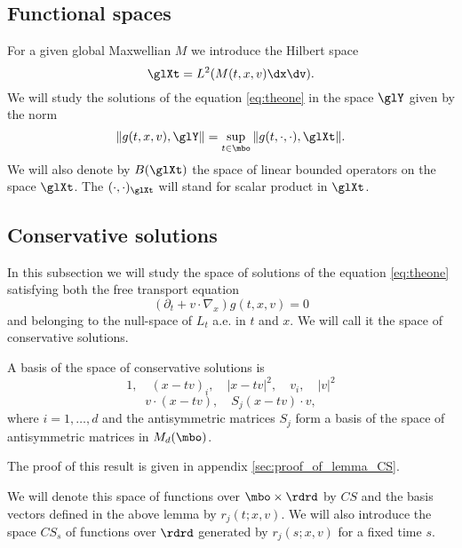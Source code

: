 \subsection{Functional spaces} %
\label{sub:functional_spaces}
For a given global Maxwellian $M$ we introduce the Hilbert space 
\begin{equation}
	\label{eq:Xt}
	\glXt=L^2(M(t,x,v)\dx\dv).
\end{equation}
We will study the solutions of the equation \eqref{eq:theone} in the space $\glY$ given by the norm
\begin{equation}
	\label{eq:Y}
	\|g(t,x,v),\glY\|=\sup_{t\in\mbo}\|g(t,\cdot,\cdot),\glXt\|.
\end{equation}
We will also denote by $B(\glXt)$ the space of linear bounded operators on the space $\glXt$. The $(\cdot,\cdot)_{\glXt}$ will stand for scalar product in $\glXt$.

\subsection{Conservative solutions} %
\label{sub:conservative_solutions}
In this subsection we will study the space of solutions of the equation \eqref{eq:theone} satisfying both the free transport equation
\[(\partial_t + v\cdot \nabla_x)g(t,x,v)=0\] and belonging to the null-space of $L_t$ a.e. in $t$ and $x$. We will call it the space of conservative solutions.	

\begin{lemma}\label{le:CS}
A basis of the space of conservative solutions is
\[1, \quad (x-tv)_i,\quad |x-tv|^2, \quad v_i,\quad |v|^2\]
\[v\cdot (x-tv),\quad S_j(x-tv)\cdot v,\]where $i=1,\dots, d$ and the antisymmetric matrices $S_j$ form a basis of the space of antisymmetric matrices in $M_d(\mbo)$.
\end{lemma}
The proof of this result is given in appendix \ref{sec:proof_of_lemma_CS}.

We will denote this space of functions over $\mbo\times\rdrd$ by $CS$ and the basis vectors defined in the above lemma by $r_j(t;x,v)$. We will also introduce the space $CS_s$ of functions over $\rdrd$ generated by $r_j(s;x,v)$ for a fixed time $s$.


